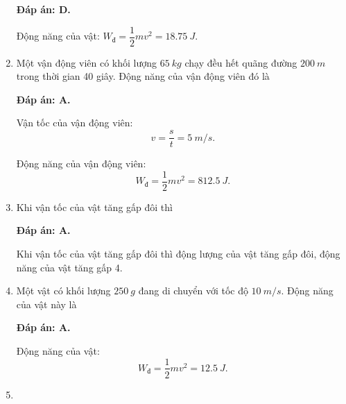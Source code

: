 \begin{enumerate}[label=\bfseries Câu \arabic*:, leftmargin=1.5cm]
	\hideall
	{	
		\textbf{Đáp án: D.}
		
		Động năng của vật: $W_\text{đ} = \dfrac{1}{2}mv^2 = \SI{18.75}{J}$.
	}
	\item {}
	
	
	{
		Một vận động viên có khối lượng $\SI{65}{kg}$ chạy đều hết quãng đường $\SI{200}{m}$ trong thời gian 40 giây. Động năng của vận động viên đó là
	}
	
	\hideall
	{	
		\textbf{Đáp án: A.}
		
		Vận tốc của vận động viên:
		$$v=\dfrac{s}{t} = \SI{5}{m/s}.$$
		
		Động năng của vận động viên:
		$$W_\text{đ} = \dfrac{1}{2} mv^2 = \SI{812.5}{J}.$$
	}
	\item {}
	
	
	{
		Khi vận tốc của vật tăng gấp đôi thì
	}
	
	\hideall
	{	
		\textbf{Đáp án: A.}
		
		Khi vận tốc của vật tăng gấp đôi thì động lượng của vật tăng gấp đôi, động năng của vật tăng gấp 4.
	}
	\item {}
	
	
	{
		Một vật có khối lượng $\SI{250}{g}$ đang di chuyển với tốc độ $\SI{10}{m/s}$. Động năng của vật này là
	}
	
	\hideall
	{	
		\textbf{Đáp án: A.}
		
		Động năng của vật:
		$$W_\text{đ} = \dfrac{1}{2} mv^2  =\SI{12.5}{J}.$$
	}
	\item {}
	

\end{enumerate}
